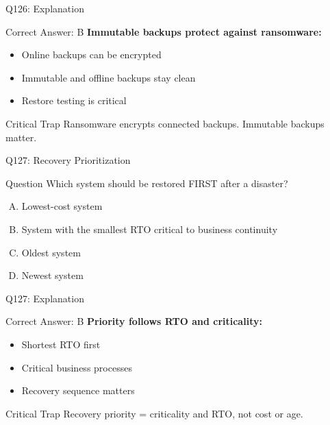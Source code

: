 \documentclass{beamer}
\begin{document}
	\begin{frame}{Q126: Explanation}
		\begin{block}{Correct Answer: B}
			\textbf{Immutable backups protect against ransomware:}
			\begin{itemize}
				\item Online backups can be encrypted
				\item Immutable and offline backups stay clean
				\item Restore testing is critical
			\end{itemize}
		\end{block}
		\begin{alertblock}{Critical Trap}
			Ransomware encrypts connected backups. Immutable backups matter.
		\end{alertblock}
	\end{frame}
	
	\begin{frame}{Q127: Recovery Prioritization}
		\begin{block}{Question}
			Which system should be restored FIRST after a disaster?
		\end{block}
		\begin{enumerate}[(A)]
			\item Lowest-cost system
			\item System with the smallest RTO critical to business continuity
			\item Oldest system
			\item Newest system
		\end{enumerate}
	\end{frame}
	
	\begin{frame}{Q127: Explanation}
		\begin{block}{Correct Answer: B}
			\textbf{Priority follows RTO and criticality:}
			\begin{itemize}
				\item Shortest RTO first
				\item Critical business processes
				\item Recovery sequence matters
			\end{itemize}
		\end{block}
		\begin{alertblock}{Critical Trap}
			Recovery priority = criticality and RTO, not cost or age.
		\end{alertblock}
	\end{frame}
	
\end{document}
